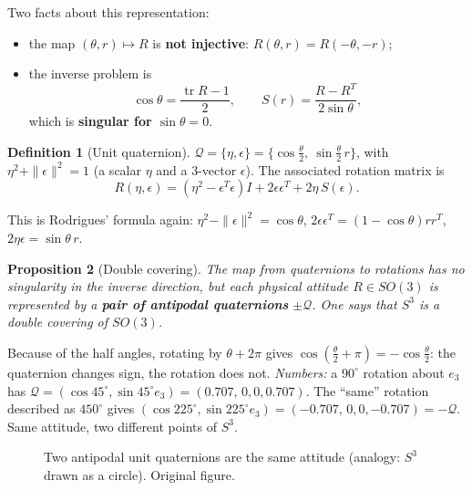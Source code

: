\documentclass[11pt,a4paper]{article}
\newcommand{\tr}{\operatorname{tr}}
\theoremstyle{definition}
\newtheorem{definition}{Definition}[section]
\theoremstyle{plain}
\newtheorem{proposition}[definition]{Proposition}
\theoremstyle{remark}
\begin{document}
Two facts about this representation:
\begin{itemize}
  \item the map $(\theta,r)\mapsto R$ is \textbf{not injective}: $R(\theta,r)=R(-\theta,-r)$;
  \item the inverse problem is
  \[
  \cos\theta=\frac{\tr R-1}{2},\qquad S(r)=\frac{R-R^T}{2\sin\theta},
  \]
  which is \textbf{singular for $\sin\theta=0$}.
\end{itemize}

\begin{definition}[Unit quaternion]
$\mathcal Q=\{\eta,\epsilon\}=\{\cos\tfrac\theta2,\ \sin\tfrac\theta2\,r\}$, with $\eta^2+\|\epsilon\|^2=1$ (a scalar $\eta$ and a 3-vector $\epsilon$). The associated rotation matrix is
\[
R(\eta,\epsilon)=(\eta^2-\epsilon^T\epsilon)I+2\epsilon\epsilon^T+2\eta\,S(\epsilon).
\]
\end{definition}
This is Rodrigues' formula again: $\eta^2-\|\epsilon\|^2=\cos\theta$, $2\epsilon\epsilon^T=(1-\cos\theta)rr^T$, $2\eta\epsilon=\sin\theta\,r$.

\begin{proposition}[Double covering]
The map from quaternions to rotations has no singularity in the inverse direction, but each physical attitude $R\in SO(3)$ is represented by a \textbf{pair of antipodal quaternions} $\pm\mathcal Q$. One says that $S^3$ is a \emph{double covering} of $SO(3)$.
\end{proposition}

\begin{intuition}
Because of the half angles, rotating by $\theta+2\pi$ gives $\cos(\tfrac\theta2+\pi)=-\cos\tfrac\theta2$: the quaternion changes sign, the rotation does not.
\emph{Numbers:} a $90^\circ$ rotation about $e_3$ has $\mathcal Q=(\cos45^\circ,\sin45^\circ e_3)=(0.707,\,0,0,0.707)$. The ``same'' rotation described as $450^\circ$ gives $(\cos225^\circ,\sin225^\circ e_3)=(-0.707,\,0,0,-0.707)=-\mathcal Q$. Same attitude, two different points of $S^3$.
\end{intuition}

\begin{figure}[h]
\centering
{}
\caption{Two antipodal unit quaternions are the same attitude (analogy: $S^3$ drawn as a circle). Original figure.}
\end{figure}
\end{document}
